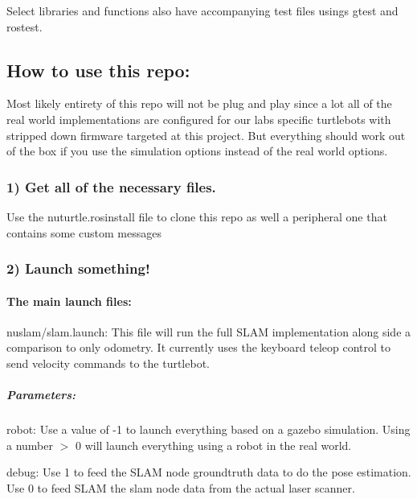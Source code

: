 Select libraries and functions also have accompanying test files usings {\ttfamily gtest} and {\ttfamily rostest}.

\subsection*{How to use this repo\+:}

Most likely entirety of this repo will not be plug and play since a lot all of the real world implementations are configured for our lab\textquotesingle{}s specific turtlebots with stripped down firmware targeted at this project. But everything should work out of the box if you use the simulation options instead of the real world options.

\subsubsection*{1) Get all of the necessary files.}

Use the nuturtle.\+rosinstall file to clone this repo as well a peripheral one that contains some custom messages

\subsubsection*{2) Launch something!}

\paragraph*{The main launch files\+:}


\begin{DoxyItemize}
\item {\ttfamily nuslam/slam.\+launch}\+: This file will run the full S\+L\+AM implementation along side a comparison to only odometry. It currently uses the keyboard teleop control to send velocity commands to the turtlebot.
\end{DoxyItemize}

\subparagraph*{Parameters\+:}


\begin{DoxyItemize}
\item robot\+: Use a value of -\/1 to launch everything based on a gazebo simulation. Using a number $>$ 0 will launch everything using a robot in the real world.
\item debug\+: Use 1 to feed the S\+L\+AM node groundtruth data to do the pose estimation. Use 0 to feed S\+L\+AM the slam node data from the actual laser scanner.
\end{DoxyItemize}

